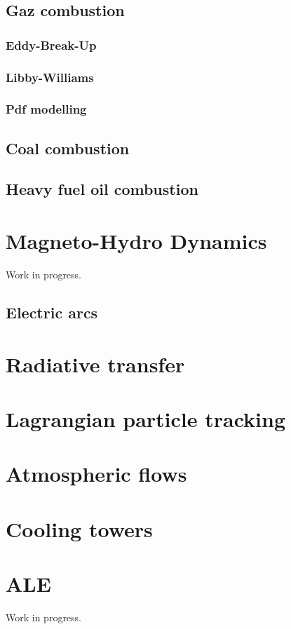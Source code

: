\documentclass[a4paper,10pt,twoside]{csdoc}
\newcounter{prog}[part]
\begin{document}
\section{Gaz combustion}
\subsection{Eddy-Break-Up}
\subsection{Libby-Williams}
\subsection{Pdf modelling}
\section{Coal combustion}
\section{Heavy fuel oil combustion}

\chapter{Magneto-Hydro Dynamics}
Work in progress.
\section{Electric arcs}
\chapter{Radiative transfer}

\chapter{Lagrangian particle tracking}

\chapter{Atmospheric flows}

\chapter{Cooling towers}

\chapter{ALE}
Work in progress.
\end{document}
